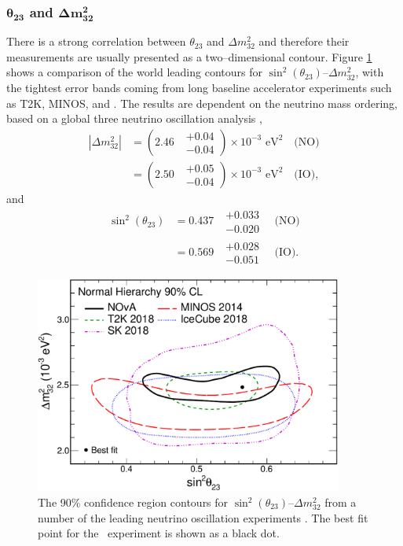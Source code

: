 {\subsubsection*{$\boldsymbol{\theta_{23}}$ and $\boldsymbol{\Delta m^2_{32}}$}
There is a strong correlation between $\theta_{23}$ and $\Delta m^2_{32}$ and
therefore their measurements are usually presented as a two--dimensional
contour. Figure \ref{fig:delm_sin23} shows a comparison of the world leading
contours for $\sin^2 (\theta_{23})$--$\Delta m^2_{32}$, with the tightest error
bands coming from long baseline accelerator experiments such as T2K, MINOS, and 
\nova \cite{PhysRevD.96.092006, PhysRevLett.112.191801,
PhysRevLett.123.151803}. The results are dependent on the neutrino mass
ordering, based on a global three neutrino oscillation analysis 
\cite{Capozzi:2016rtj, TODO}, 
\begin{align}
	\label{eqn:delta_m_32}
	|\Delta m^2_{32}| &= (2.46 \mbox{ } \substack{+ 0.04 \\ - 0.04}) \times 10^{-3} \mbox{  eV}^2 \quad \mbox{(NO)} \\
	                  &= (2.50 \mbox{ } \substack{+ 0.05 \\ - 0.04}) \times 10^{-3} \mbox{  eV}^2 \quad \mbox{(IO)},
\end{align}
and 
\begin{align}
	\label{eqn:delta_m_32}
	\sin^2(\theta_{23}) &= 0.437 \mbox{  } \substack{+ 0.033 \\ - 0.020} \quad \mbox{(NO)} \\
	                    &= 0.569 \mbox{  } \substack{+ 0.028 \\ - 0.051} \quad \mbox{(IO)}.
\end{align}
\begin{figure}
	\centering
	\includegraphics[width=0.9\textwidth]{figures/theta23_msquare.pdf}
	\caption{The 90\% confidence region contours for 
	$\sin^2 (\theta_{23})$--$\Delta m^2_{32}$ from a number of the leading 
	neutrino oscillation experiments \cite{TODO}. The best fit point for the 
	\nova \ experiment is shown as a black dot. \cite{PhysRevLett.123.151803}}
	\label{fig:delm_sin23}
\end{figure}

}
